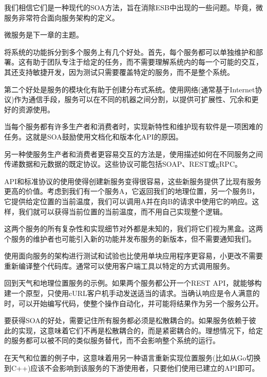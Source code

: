 我们相信它们是一种现代的SOA方法，旨在消除ESB中出现的一些问题。毕竟，微服务非常符合面向服务架构的定义。

微服务是下一章的主题。


将系统的功能拆分到多个服务上有几个好处。首先，每个服务都可以单独维护和部署。这有助于团队专注于给定的任务，而不需要理解系统内的每一个可能的交互，其还支持敏捷开发，因为测试只需要覆盖特定的服务，而不是整个系统。

第二个好处是服务的模块化有助于创建分布式系统。使用网络(通常基于Internet协议)作为通信手段，服务可以在不同的机器之间分割，以提供可扩展性、冗余和更好的资源使用。

当每个服务都有许多生产者和消费者时，实现新特性和维护现有软件是一项困难的任务。这就是SOA鼓励使用文档化和版本化API的原因。

另一种使服务生产者和消费者更容易交互的方法是，使用描述如何在不同服务之间传递数据和元数据的既定协议。这些协议可能包括SOAP、REST或gRPC。

API和标准协议的使用使得创建新服务变得很容易，这些新服务提供了比现有服务更高的价值。考虑到我们有一个服务A，它返回我们的地理位置，另一个服务B，它提供给定位置的当前温度，我们可以调用A并在向B的请求中使用它的响应。这样，我们就可以获得当前位置的当前温度，而不用自己实现整个逻辑。

这两个服务的所有复杂性和实现细节对外都是未知的，我们将它们视为黑盒。这两个服务的维护者也可能引入新的功能并发布服务的新版本，但不需要通知我们。

使用面向服务的架构进行测试和试验也比使用单块应用程序更容易，小更改不需要重新编译整个代码库。通常可以使用客户端工具以特定的方式调用服务。

回到天气和地理位置服务的示例。如果两个服务都公开一个REST API，就能够构建一个原型，只使用cURL客户机手动发送适当的请求。当确认响应是令人满意的时，可以开始编写代码，使整个操作自动化，并可能将结果作为另一个服务公开。

\begin{tcolorbox}[colback=blue!5!white,colframe=blue!75!black, title=Note]
\hspace*{0.7cm}要获得SOA的好处，需要记住所有服务都必须是松散耦合的。如果服务依赖于彼此的实现，这意味着它们不再是松散耦合的，而是紧密耦合的。理想情况下，给定的服务都可以被不同的类似服务替代，而不会影响整个系统的运行。
\end{tcolorbox}

在天气和位置的例子中，这意味着用另一种语言重新实现位置服务(比如从Go切换到C++)应该不会影响到该服务的下游使用者，只要他们使用已建立的API即可。

